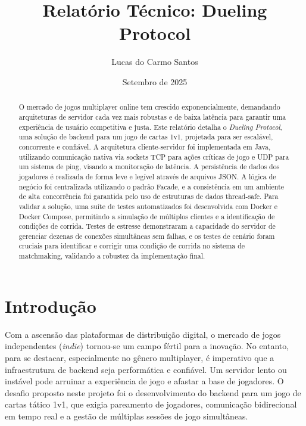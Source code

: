 \documentclass[12pt,a4paper]{article}
\title{Relatório Técnico: Dueling Protocol}
\author{Lucas do Carmo Santos}
\date{Setembro de 2025}
\begin{document}
\maketitle

\begin{abstract}
O mercado de jogos multiplayer online tem crescido exponencialmente, demandando arquiteturas de servidor cada vez mais robustas e de baixa latência para garantir uma experiência de usuário competitiva e justa. Este relatório detalha o \textit{Dueling Protocol}, uma solução de backend para um jogo de cartas 1v1, projetada para ser escalável, concorrente e confiável. A arquitetura cliente-servidor foi implementada em Java, utilizando comunicação nativa via sockets TCP para ações críticas de jogo e UDP para um sistema de ping, visando a monitoração de latência. A persistência de dados dos jogadores é realizada de forma leve e legível através de arquivos JSON. A lógica de negócio foi centralizada utilizando o padrão Facade, e a consistência em um ambiente de alta concorrência foi garantida pelo uso de estruturas de dados thread-safe. Para validar a solução, uma suíte de testes automatizados foi desenvolvida com Docker e Docker Compose, permitindo a simulação de múltiplos clientes e a identificação de condições de corrida. Testes de estresse demonstraram a capacidade do servidor de gerenciar dezenas de conexões simultâneas sem falhas, e os testes de cenário foram cruciais para identificar e corrigir uma condição de corrida no sistema de matchmaking, validando a robustez da implementação final.
\end{abstract}

\section{Introdução}

Com a ascensão das plataformas de distribuição digital, o mercado de jogos independentes (\textit{indie}) tornou-se um campo fértil para a inovação. No entanto, para se destacar, especialmente no gênero multiplayer, é imperativo que a infraestrutura de backend seja performática e confiável. Um servidor lento ou instável pode arruinar a experiência de jogo e afastar a base de jogadores. O desafio proposto neste projeto foi o desenvolvimento do backend para um jogo de cartas tático 1v1, que exigia pareamento de jogadores, comunicação bidirecional em tempo real e a gestão de múltiplas sessões de jogo simultâneas.
\end{document}
